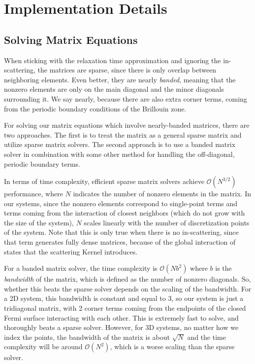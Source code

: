 \documentclass[12pt]{article}
\begin{document}
\section{Implementation Details}
\subsection{Solving Matrix Equations}
When sticking with the relaxation time approximation and ignoring the in-scattering,
the matrices are sparse, since there is only overlap between neighboring elements.
Even better, they are nearly \emph{banded}, meaning that the nonzero elements are only on the main
diagonal and the minor diagonals surrounding it. We say nearly, because there are also extra corner
terms, coming from the periodic boundary conditions of the Brillouin zone.

For solving our matrix equations which involve nearly-banded matrices, there are two approaches.
The first is to treat the matrix as a general sparse matrix and utilize sparse matrix solvers.
The second approach is to use a banded matrix solver in combination with some other method for
handling the off-diagonal, periodic boundary terms.

In terms of time complexity, efficient sparse matrix solvers achieve
$\mathcal{O}(N^{3/2})$ performance, where $N$ indicates the number of nonzero elements in the
matrix. In our systems, since the nonzero elements correspond to single-point terms and terms
coming from the interaction of closest neighbors (which do not grow with the size of the system),
$N$ scales linearly with the number of discretization points of the system. Note that this is only
true when there is no in-scattering, since that term generates fully dense matrices, because of
the global interaction of states that the scattering Kernel introduces.

For a banded matrix solver, the time complexity is $\mathcal{O}(Nb^2)$ where $b$ is the
\emph{bandwidth} of the matrix, which is defined as the number of nonzero diagonals. So, whether
this beats the sparse solver depends on the scaling of the bandwidth. For a 2D system, this
bandwidth is constant and equal to 3, so our system is just a tridiagonal matrix, with 2 corner
terms coming from the endpoints of the closed Fermi surface interacting with each other. This
is extremely fast to solve, and thoroughly beats a sparse solver. However, for 3D systems, no
matter how we index the points, the bandwidth of the matrix is about $\sqrt{N}$ and the time
complexity will be around $\mathcal{O}(N^2)$, which is a worse scaling than the sparse solver.
\end{document}
